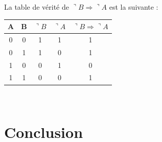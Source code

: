 \documentclass[a4]{article}
\begin{document}
La table de vérité de $\urcorner B \Rightarrow \urcorner A$ est la suivante :\\

\begin{tabular}{|c|c||c|c||c|}
\hline
A & B & $\urcorner B$ & $\urcorner A$ & $\urcorner B \Rightarrow \urcorner A$\\
\hline
\hline
0 & 0 & 1 & 1 & 1\\
\hline
0 & 1 & 1 & 0 & 1\\
\hline
1 & 0 & 0 & 1 & 0\\
\hline
1 & 1 & 0 & 0 & 1\\
\hline
\end{tabular}\\
\section{Conclusion}
\end{document}
